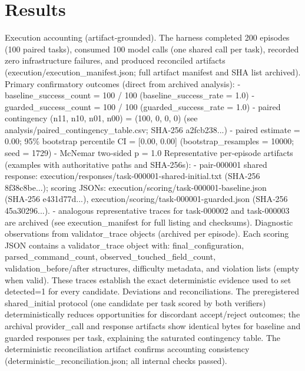 \documentclass[conference]{IEEEtran}
\begin{document}
\section{Results}
Execution accounting (artifact‑grounded). The harness completed 200 episodes (100 paired tasks), consumed 100 model calls (one shared call per task), recorded zero infrastructure failures, and produced reconciled artifacts (execution/execution\_manifest.json; full artifact manifest and SHA list archived). Primary confirmatory outcomes (direct from archived analysis):
- baseline\_success\_count = 100 / 100 (baseline\_success\_rate = 1.0)
- guarded\_success\_count = 100 / 100 (guarded\_success\_rate = 1.0)
- paired contingency (n11, n10, n01, n00) = (100, 0, 0, 0) (see analysis/paired\_contingency\_table.csv; SHA‑256 a2fcb238...)
- paired estimate = 0.00; 95\% bootstrap percentile CI = [0.00, 0.00] (bootstrap\_resamples = 10000; seed = 1729)
- McNemar two‑sided p = 1.0
Representative per‑episode artifacts (examples with authoritative paths and SHA‑256s):
- pair-000001 shared response: execution/responses/task-000001-shared-initial.txt (SHA‑256 8f38c8be...); scoring JSONs: execution/scoring/task-000001-baseline.json (SHA‑256 e431d77d...), execution/scoring/task-000001-guarded.json (SHA‑256 45a30296...).
- analogous representative traces for task-000002 and task-000003 are archived (see execution\_manifest for full listing and checksums).
Diagnostic observations from validator\_trace objects (archived per episode). Each scoring JSON contains a validator\_trace object with: final\_configuration, parsed\_command\_count, observed\_touched\_field\_count, validation\_before/after structures, difficulty metadata, and violation lists (empty when valid). These traces establish the exact deterministic evidence used to set detected=1 for every candidate.
Deviations and reconciliations. The preregistered shared\_initial protocol (one candidate per task scored by both verifiers) deterministically reduces opportunities for discordant accept/reject outcomes; the archival provider\_call and response artifacts show identical bytes for baseline and guarded responses per task, explaining the saturated contingency table. The deterministic reconciliation artifact confirms accounting consistency (deterministic\_reconciliation.json; all internal checks passed).
\end{document}

